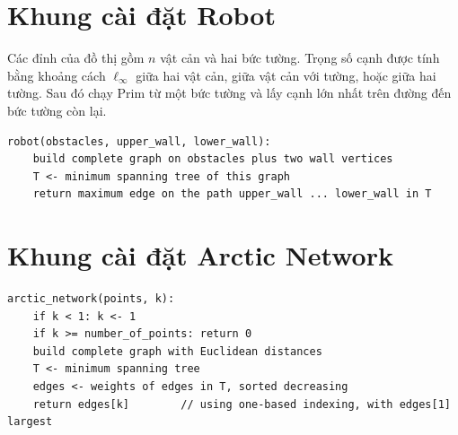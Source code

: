 \documentclass[11pt]{article}
\begin{document}
\section{Khung cài đặt Robot}

Các đỉnh của đồ thị gồm $n$ vật cản và hai bức tường. Trọng số cạnh được tính
bằng khoảng cách $\ell_\infty$ giữa hai vật cản, giữa vật cản với tường, hoặc
giữa hai tường. Sau đó chạy Prim từ một bức tường và lấy cạnh lớn nhất trên
đường đến bức tường còn lại.

\begin{verbatim}
robot(obstacles, upper_wall, lower_wall):
    build complete graph on obstacles plus two wall vertices
    T <- minimum spanning tree of this graph
    return maximum edge on the path upper_wall ... lower_wall in T
\end{verbatim}

\section{Khung cài đặt Arctic Network}

\begin{verbatim}
arctic_network(points, k):
    if k < 1: k <- 1
    if k >= number_of_points: return 0
    build complete graph with Euclidean distances
    T <- minimum spanning tree
    edges <- weights of edges in T, sorted decreasing
    return edges[k]        // using one-based indexing, with edges[1] largest
\end{verbatim}
\end{document}
